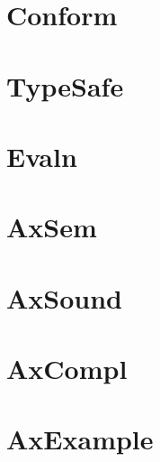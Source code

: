 \documentclass[11pt,a4paper]{book}
\begin{document}
\chapter{Conform}
       
\chapter{TypeSafe}


\chapter{Evaln}
         
\chapter{AxSem}
      
\chapter{AxSound}
    
\chapter{AxCompl}
    
\chapter{AxExample}
  

%
%
\end{document}
